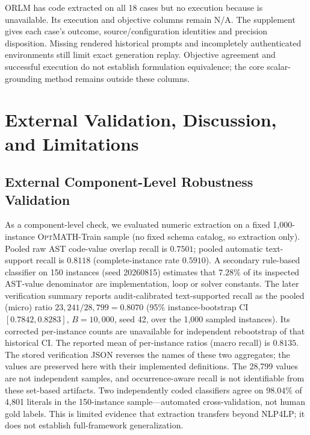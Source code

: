 \documentclass[pdflatex,sn-basic,Numbered]{sn-jnl}
\begin{document}
ORLM has code extracted on all 18 cases but no execution because  is unavailable. Its execution and objective columns remain N/A. The supplement gives each case's outcome, source/configuration identities and precision disposition. Missing rendered historical prompts and incompletely authenticated environments still limit exact generation replay. Objective agreement and successful execution do not establish formulation equivalence; the core scalar-grounding method remains outside these columns.



\section{External Validation, Discussion, and Limitations}
\label{sec:discussion}
\subsection{External Component-Level Robustness Validation}
\label{subsec:exp_external_validation}

As a component-level check, we evaluated numeric extraction on a fixed 1,000-instance \textsc{OptMATH}-Train sample \cite{lu2025optmath} (no fixed schema catalog, so extraction only). Pooled raw AST code-value overlap recall is $0.7501$; pooled automatic text-support recall is $0.8118$ (complete-instance rate $0.5910$). A secondary rule-based classifier on 150 instances (seed 20260815) estimates that $7.28\%$ of its inspected AST-value denominator are implementation, loop or solver constants. The later verification summary reports audit-calibrated text-supported recall as the pooled (micro) ratio $23{,}241/28{,}799=0.8070$ (95\% instance-bootstrap CI $[0.7842,0.8283]$, $B=10{,}000$, seed 42, over the 1,000 sampled instances). Its corrected per-instance counts are unavailable for independent rebootstrap of that historical CI. The reported mean of per-instance ratios (macro recall) is $0.8135$. The stored verification JSON reverses the names of these two aggregates; the values are preserved here with their implemented definitions. The 28,799 values are not independent samples, and occurrence-aware recall is not identifiable from these set-based artifacts. Two independently coded classifiers agree on $98.04\%$ of 4,801 literals in the 150-instance sample---automated cross-validation, not human gold labels. This is limited evidence that extraction transfers beyond \textsc{NLP4LP}; it does not establish full-framework generalization.
\end{document}
